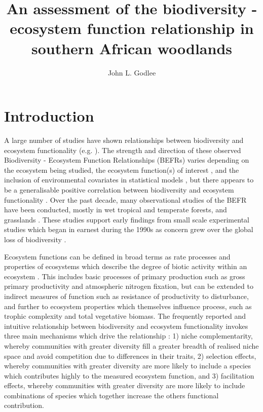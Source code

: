 \documentclass[11pt,a4paper]{article}
\title{An assessment of the biodiversity - ecosystem function relationship in southern African woodlands}
\author{John L. Godlee}
\date{}
\begin{document}
\maketitle
\tableofcontents

\section{Introduction}

A large number of studies have shown relationships between biodiversity and ecosystem functionality (e.g. \citealt{Liang2016, Cardinale2009}). The strength and direction of these observed Biodiversity - Ecosystem Function Relationships (BEFRs) varies depending on the ecosystem being studied, the ecosystem function(s) of interest \citep{Hector2007}, and the inclusion of environmental covariates in statistical models \citep{Vila2005}, but there appears to be a generalisable positive correlation between biodiversity and ecosystem functionality \citep{Liang2016}. Over the past decade, many observational studies of the BEFR have been conducted, mostly in wet tropical and temperate forests, and grasslands \citep{Chen2011}. These studies support early findings from small scale experimental studies which began in earnest during the 1990s as concern grew over the global loss of biodiversity \citep{Tilman1994, Tilman2014}.

Ecosystem functions can be defined in broad terms as rate processes and properties of ecosystems which describe the degree of biotic activity within an ecosystem \citep{Jax2005}. This includes basic processes of primary production such as gross primary productivity and atmospheric nitrogen fixation, but can be extended to indirect measures of function such as resistance of productivity to disturbance, and further to ecosystem properties which themselves influence process, such as trophic complexity and total vegetative biomass. The frequently reported and intuitive relationship between biodiversity and ecosystem functionality invokes three main mechanisms which drive the relationship \citep{Tilman2014}: 1) niche complementarity, whereby communities with greater diversity fill a greater breadth of realised niche space and avoid competition due to differences in their traits, 2) selection effects, whereby communities with greater diversity are more likely to include a species which contributes highly to the measured ecosystem function, and 3) facilitation effects, whereby communities with greater diversity are more likely to include combinations of species which together increase the others functional contribution.
\end{document}

